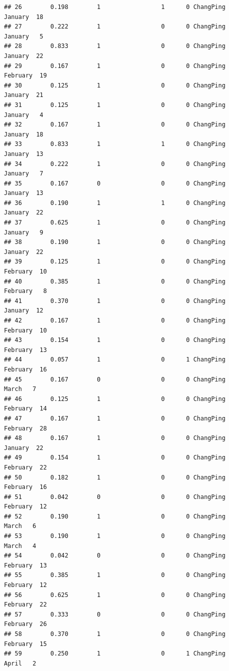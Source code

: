 \documentclass[
]{article}
\begin{document}
\begin{verbatim}
## 26        0.198        1                 1      0 ChangPing   January  18
## 27        0.222        1                 0      0 ChangPing   January   5
## 28        0.833        1                 0      0 ChangPing   January  22
## 29        0.167        1                 0      0 ChangPing  February  19
## 30        0.125        1                 0      0 ChangPing   January  21
## 31        0.125        1                 0      0 ChangPing   January   4
## 32        0.167        1                 0      0 ChangPing   January  18
## 33        0.833        1                 1      0 ChangPing   January  13
## 34        0.222        1                 0      0 ChangPing   January   7
## 35        0.167        0                 0      0 ChangPing   January  13
## 36        0.190        1                 1      0 ChangPing   January  22
## 37        0.625        1                 0      0 ChangPing   January   9
## 38        0.190        1                 0      0 ChangPing   January  22
## 39        0.125        1                 0      0 ChangPing  February  10
## 40        0.385        1                 0      0 ChangPing  February   8
## 41        0.370        1                 0      0 ChangPing   January  12
## 42        0.167        1                 0      0 ChangPing  February  10
## 43        0.154        1                 0      0 ChangPing  February  13
## 44        0.057        1                 0      1 ChangPing  February  16
## 45        0.167        0                 0      0 ChangPing     March   7
## 46        0.125        1                 0      0 ChangPing  February  14
## 47        0.167        1                 0      0 ChangPing  February  28
## 48        0.167        1                 0      0 ChangPing   January  22
## 49        0.154        1                 0      0 ChangPing  February  22
## 50        0.182        1                 0      0 ChangPing  February  16
## 51        0.042        0                 0      0 ChangPing  February  12
## 52        0.190        1                 0      0 ChangPing     March   6
## 53        0.190        1                 0      0 ChangPing     March   4
## 54        0.042        0                 0      0 ChangPing  February  13
## 55        0.385        1                 0      0 ChangPing  February  12
## 56        0.625        1                 0      0 ChangPing  February  22
## 57        0.333        0                 0      0 ChangPing  February  26
## 58        0.370        1                 0      0 ChangPing  February  15
## 59        0.250        1                 0      1 ChangPing     April   2

\end{verbatim}
\end{document}
